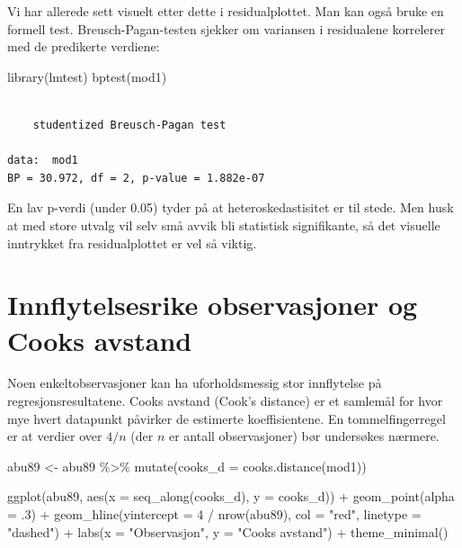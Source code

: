 \documentclass[
  norsk,
  letterpaper,
  DIV=11,
  numbers=noendperiod]{scrreprt}
\newenvironment{Shaded}{\begin{snugshade}}{\end{snugshade}}
\newcommand{\AttributeTok}[1]{\textcolor[rgb]{0.40,0.45,0.13}{#1}}
\newcommand{\DecValTok}[1]{\textcolor[rgb]{0.68,0.00,0.00}{#1}}
\newcommand{\FunctionTok}[1]{\textcolor[rgb]{0.28,0.35,0.67}{#1}}
\newcommand{\NormalTok}[1]{\textcolor[rgb]{0.00,0.23,0.31}{#1}}
\newcommand{\OtherTok}[1]{\textcolor[rgb]{0.00,0.23,0.31}{#1}}
\newcommand{\SpecialCharTok}[1]{\textcolor[rgb]{0.37,0.37,0.37}{#1}}
\newcommand{\StringTok}[1]{\textcolor[rgb]{0.13,0.47,0.30}{#1}}
\theoremstyle{definition}
\theoremstyle{remark}
\begin{document}
Vi har allerede sett visuelt etter dette i residualplottet. Man kan også
bruke en formell test. Breusch-Pagan-testen sjekker om variansen i
residualene korrelerer med de predikerte verdiene:

\begin{Shaded}
\begin{Highlighting}[]
\FunctionTok{library}\NormalTok{(lmtest)}
\FunctionTok{bptest}\NormalTok{(mod1)}
\end{Highlighting}
\end{Shaded}

\begin{verbatim}

    studentized Breusch-Pagan test

data:  mod1
BP = 30.972, df = 2, p-value = 1.882e-07
\end{verbatim}

En lav p-verdi (under 0.05) tyder på at heteroskedastisitet er til
stede. Men husk at med store utvalg vil selv små avvik bli statistisk
signifikante, så det visuelle inntrykket fra residualplottet er vel så
viktig.

\section{Innflytelsesrike observasjoner og Cooks
avstand}\label{innflytelsesrike-observasjoner-og-cooks-avstand}

Noen enkeltobservasjoner kan ha uforholdsmessig stor innflytelse på
regresjonsresultatene. Cooks avstand (Cook's distance) er et samlemål
for hvor mye hvert datapunkt påvirker de estimerte koeffisientene. En
tommelfingerregel er at verdier over \(4/n\) (der \(n\) er antall
observasjoner) bør undersøkes nærmere.

\begin{Shaded}
\begin{Highlighting}[]
\NormalTok{abu89 }\OtherTok{\textless{}{-}}\NormalTok{ abu89 }\SpecialCharTok{\%\textgreater{}\%}
  \FunctionTok{mutate}\NormalTok{(}\AttributeTok{cooks\_d =} \FunctionTok{cooks.distance}\NormalTok{(mod1))}

\FunctionTok{ggplot}\NormalTok{(abu89, }\FunctionTok{aes}\NormalTok{(}\AttributeTok{x =} \FunctionTok{seq\_along}\NormalTok{(cooks\_d), }\AttributeTok{y =}\NormalTok{ cooks\_d)) }\SpecialCharTok{+}
  \FunctionTok{geom\_point}\NormalTok{(}\AttributeTok{alpha =}\NormalTok{ .}\DecValTok{3}\NormalTok{) }\SpecialCharTok{+}
  \FunctionTok{geom\_hline}\NormalTok{(}\AttributeTok{yintercept =} \DecValTok{4} \SpecialCharTok{/} \FunctionTok{nrow}\NormalTok{(abu89), }\AttributeTok{col =} \StringTok{"red"}\NormalTok{, }\AttributeTok{linetype =} \StringTok{"dashed"}\NormalTok{) }\SpecialCharTok{+}
  \FunctionTok{labs}\NormalTok{(}\AttributeTok{x =} \StringTok{"Observasjon"}\NormalTok{, }\AttributeTok{y =} \StringTok{"Cooks avstand"}\NormalTok{) }\SpecialCharTok{+}
  \FunctionTok{theme\_minimal}\NormalTok{()}
\end{Highlighting}
\end{Shaded}
\end{document}
